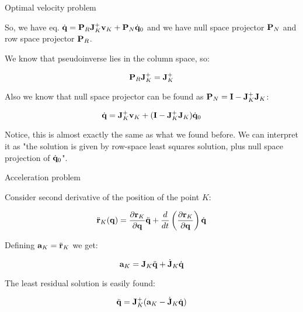 \documentclass{beamer}
\begin{document}
\begin{frame}{Optimal velocity problem}
	\begin{flushleft}
		
		So, we have eq. $\dot{\mathbf{q}} =\mathbf{P}_R \mathbf{J}_K^+ \mathbf{v}_K +  
		\mathbf{P}_N \dot{\mathbf{q}}_0$ and we have null space projector $\mathbf{P}_N$ and row space projector $\mathbf{P}_R$.
		
		\bigskip
		
		We know that pseudoinverse lies in the column space, so:
		
		\begin{equation}
			 \mathbf{P}_R \mathbf{J}_K^+ = \mathbf{J}_K^+
		\end{equation}
	
		Also we know that null space projector can be found as $\mathbf{P}_N = \mathbf{I} - \mathbf{J}_K^+\mathbf{J}_K$:
		
		\begin{equation}
			\dot{\mathbf{q}} =\mathbf{J}_K^+ \mathbf{v}_K +  
			(\mathbf{I} - \mathbf{J}_K^+\mathbf{J}_K) \dot{\mathbf{q}}_0
		\end{equation}		
	
		Notice, this is almost exactly the same as what we found before. We can interpret it as "the solution is given by row-space least squares solution, plus null space projection of $\dot{\mathbf{q}}_0$".
		
	\end{flushleft}
\end{frame}




\begin{frame}{Acceleration problem}
	\begin{flushleft}
		
		Consider second derivative of the position of the point $K$:
		
\begin{equation}
	\ddot{\mathbf{r}}_K(\mathbf{q}) = \frac{\partial \mathbf{r}_K}{\partial  \mathbf{q}} \ddot{\mathbf{q}} 
	+ 
	\frac{d}{dt} \left( \frac{\partial \mathbf{r}_K}{\partial  \mathbf{q}} \right) \dot{\mathbf{q}}
\end{equation}		
		
		Defining $\mathbf{a}_K = \ddot{\mathbf{r}}_K$ we get:
		
\begin{equation}
	\mathbf{a}_K = \mathbf{J}_K \ddot{\mathbf{q}} 
	+ 
	\dot{\mathbf{J}}_K \dot{\mathbf{q}}
\end{equation}	

		The least residual solution is easily found:
		
\begin{equation}
	\ddot{\mathbf{q}}  = \mathbf{J}_K^+
	(\mathbf{a}_K - \dot{\mathbf{J}}_K \dot{\mathbf{q}})
\end{equation}						
		
	\end{flushleft}
\end{frame}
\end{document}
